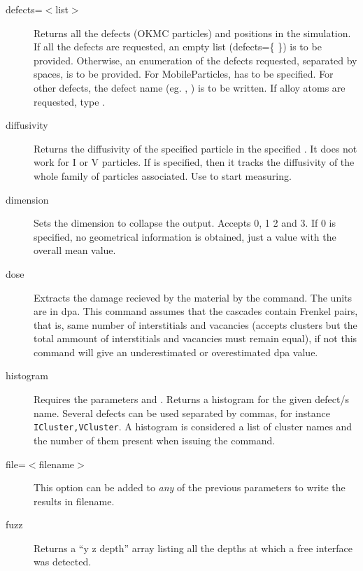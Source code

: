 \begin{description}
\item [defects=$<$list$>$] Returns all the defects (OKMC particles) and positions in the simulation. If all the defects are requested, an empty list (defects=\{ \}) is to be provided. Otherwise, an enumeration of the defects requested, separated by spaces, is to be provided. For MobileParticles,  has to be specified. For other defects, the defect name (eg. , ) is to be written. If alloy atoms are requested, type .

\item [diffusivity] Returns the diffusivity of the specified particle  in the specified  . It does not work for I or V particles. If  is specified, then it tracks the diffusivity of the whole family of particles associated. Use  to start measuring.

\item [dimension] Sets the dimension to collapse the output. Accepts 0, 1 2 and 3. If 0 is specified, no geometrical information is obtained, just a value with the overall mean value.

\item [dose] Extracts the damage recieved by the material by the  command. The units are in dpa. This command assumes that the cascades contain Frenkel pairs, that is, same number of interstitials and vacancies (accepts clusters but the total ammount of interstitials and vacancies must remain equal), if not this command will give an underestimated or overestimated dpa value.

\item [histogram] Requires the parameters  and . Returns a histogram for the given defect/s name. Several defects can be used separated by commas, for instance {\tt ICluster,VCluster}. A histogram is considered a list of cluster names and the number of them present when issuing the command. 

\item [file=$<$filename$>$] This option can be added to {\em any} of the previous parameters to write the results in filename.

\item [fuzz] Returns a ``y z depth'' array listing all the depths at which a free interface was detected.


\end{description}
